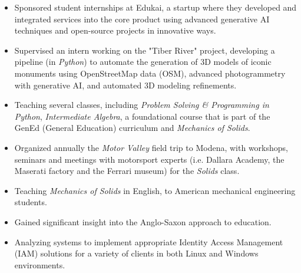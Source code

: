 	\begin{itemize}
		\item Sponsored student internships at Edukai, a startup where they developed and integrated services into the core product using advanced generative AI techniques and open-source projects in innovative ways.
		\item Supervised an intern working on the "Tiber River" project, developing a pipeline (in \emph{Python}) to automate the generation of 3D models of iconic monuments using OpenStreetMap data (OSM), advanced photogrammetry with generative AI, and automated 3D modeling refinements. %
	\end{itemize}
	\smallskip

	\medskip

	\begin{itemize}
		\item Teaching several classes, including \emph{Problem Solving \& Programming in Python}, \emph{Intermediate Algebra}, a foundational course that is part of the GenEd (General Education) curriculum and \emph{Mechanics of Solids}.
		\item Organized annually the \emph{Motor Valley} field trip to Modena, with workshops, seminars and meetings with motorsport experts (i.e. Dallara Academy, the Maserati factory and the Ferrari museum) for the \emph{Solids} class.
	\end{itemize}
	\smallskip
	\medskip

	\begin{itemize}
		\item Teaching \emph{Mechanics of Solids} in English, to American mechanical engineering students.
		\item Gained significant insight into the Anglo-Saxon approach to education.
	\end{itemize}
	\smallskip

	\divider

	\begin{itemize}
		\item Analyzing systems to implement appropriate Identity Access Management (IAM) solutions for a variety of clients in both Linux and Windows environments.
	\end{itemize}

